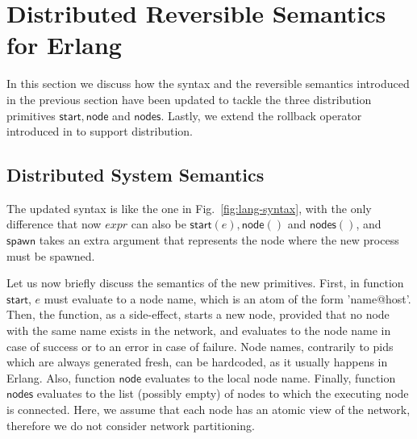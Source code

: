 \documentclass[runningheads]{llncs}
\newcommand{\ms}[1]{\mathsf{#1}}
\begin{document}
\section{Distributed Reversible Semantics for Erlang}\label{sec:semantics}

In this section we discuss how the syntax and the reversible semantics introduced in the previous section have been updated to tackle the three distribution primitives $\ms{start,node}$ and $\ms{nodes}$.
Lastly, we extend the rollback operator introduced in \cite{LaneseNPV18,LanesePV21} to support distribution.

\subsection{Distributed System Semantics}


The updated syntax is like the one in Fig.~\ref{fig:lang-syntax},
with the only difference that now $expr$ can also be $\ms{start}(e), \ms{node}()$
and $\ms{nodes}()$,
and $\ms{spawn}$ takes an extra argument
that represents the node where the new process must be spawned.


Let us now briefly discuss the semantics of the new primitives. First, in
function $\ms{start}$, $e$ must evaluate to a node name, which is an atom of
the form 'name@host'. Then, the function, as a side-effect, starts a new node, provided that no node with the same name exists in the network,
and evaluates to the node name in case of success or to an error in case of
failure. Node names, contrarily to pids which are always generated fresh, can be hardcoded, as it usually happens in Erlang. Also, function
$\ms{node}$ evaluates to the local node name. Finally, function $\ms{nodes}$
evaluates to the list (possibly empty) of nodes to which the executing node is connected. Here, we assume that each node has an atomic view of the network, therefore we do not consider network partitioning. 

\end{document}
